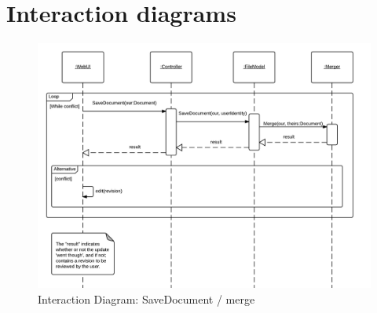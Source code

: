 \section{Interaction diagrams}
\label{sec:interactiondiagrams}

\begin{figure}[htb]
	\centering
	\includegraphics[width=1\textwidth]{Appendices/graphics/Interaction-merge.png}
	\caption{Interaction Diagram: SaveDocument / merge}
	\label{fig:interaction-merge-diagram}
\end{figure}
